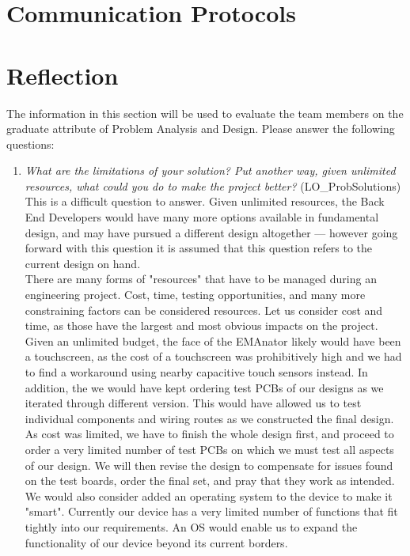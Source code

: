 \documentclass[12pt, titlepage]{article}
\begin{document}
\section{Communication Protocols}

\section{Reflection}

The information in this section will be used to evaluate the team members on the
graduate attribute of Problem Analysis and Design.  Please answer the following questions:

\begin{enumerate}
  \item \textit{What are the limitations of your solution?  Put another way, given
  unlimited resources, what could you do to make the project better? }(LO\_ProbSolutions)\\

This is a difficult question to answer. Given unlimited resources, the Back End Developers would have many more options available in fundamental design, and may have pursued a different design altogether --- however going forward with this question it is assumed that this question refers to the current design on hand.\\

There are many forms of "resources" that have to be managed during an engineering project. Cost, time, testing opportunities, and many more constraining factors can be considered resources. Let us consider cost and time, as those have the largest and most obvious impacts on the project.\\

Given an unlimited budget, the face of the EMAnator likely would have been a touchscreen, as the cost of a touchscreen was prohibitively high and we had to find a workaround using nearby capacitive touch sensors instead. In addition, the we would have kept ordering test PCBs of our designs as we iterated through different version. This would have allowed us to test individual components and wiring routes as we constructed the final design. As cost was limited, we have to finish the whole design first, and proceed to order a very limited number of test PCBs on which we must test all aspects of our design. We will then revise the design to compensate for issues found on the test boards, order the final set, and pray that they work as intended. We would also consider added an operating system to the device to make it "smart". Currently our device has a very limited number of functions that fit tightly into our requirements. An OS would enable us to expand the functionality of our device beyond its current borders.\\


\end{enumerate}
\end{document}
